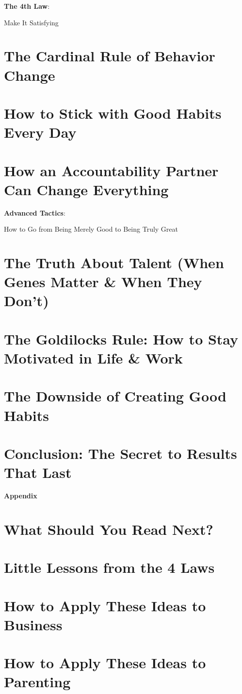 \documentclass[oneside]{article}
\numberwithin{equation}{section}
\begin{document}
\begin{center}\huge
    \textbf{The 4th Law}:
    
    Make It Satisfying
\end{center}

\section{The Cardinal Rule of Behavior Change}

\section{How to Stick with Good Habits Every Day}

\section{How an Accountability Partner Can Change Everything}

\begin{center}\huge
    \textbf{Advanced Tactics}:
    
    How to Go from Being Merely Good to Being Truly Great
\end{center}

\section{The Truth About Talent (When Genes Matter \& When They Don't)}

\section{The Goldilocks Rule: How to Stay Motivated in Life \& Work}

\section{The Downside of Creating Good Habits}

\section{Conclusion: The Secret to Results That Last}

\begin{center}\huge
    \textbf{Appendix}
\end{center}

\section{What Should You Read Next?}

\section{Little Lessons from the 4 Laws}

\section{How to Apply These Ideas to Business}

\section{How to Apply These Ideas to Parenting}


\printbibliography[heading=bibintoc]
\end{document}
